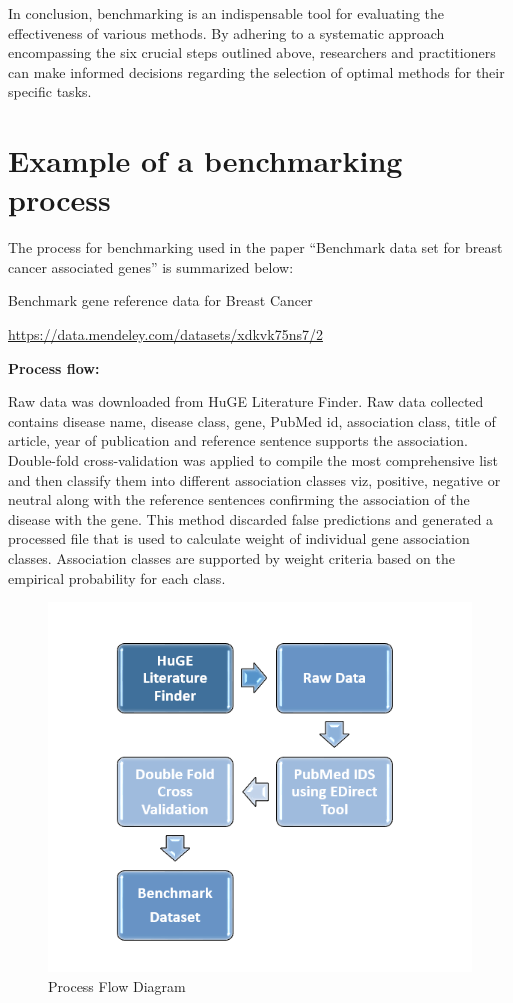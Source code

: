 In conclusion, benchmarking is an indispensable tool for evaluating the effectiveness of various methods. By adhering to a systematic approach encompassing the six crucial steps outlined above, researchers and practitioners can make informed decisions regarding the selection of optimal methods for their specific tasks.



 
\section{Example of a benchmarking process}

The process for benchmarking used in the paper “Benchmark data set for breast cancer associated genes” is summarized below:

Benchmark gene reference data for Breast Cancer

\href{https://data.mendeley.com/datasets/xdkvk75ns7/2}{https://data.mendeley.com/datasets/xdkvk75ns7/2}
\newline

\textbf{Process flow:}

Raw data was downloaded from HuGE Literature Finder. Raw data collected contains disease name, disease class, gene, PubMed id, association class, title of article, year of publication and reference sentence supports the association. Double-fold cross-validation was applied to compile the most comprehensive list and then classify them into different association classes viz, positive, negative or neutral along with the reference sentences confirming the association of the disease with the gene. This method discarded false predictions and generated a processed file that is used to calculate weight of individual gene association classes. Association classes are supported by weight criteria based on the empirical probability for each class.\cite{35}
\begin{figure}[!h]
    \centering
    \includegraphics[width=0.8\linewidth]{Breast Cancer Flow.PNG}
    \caption{Process Flow Diagram}
    \label{fig:Process Flow BRCA1l}
\end{figure}









